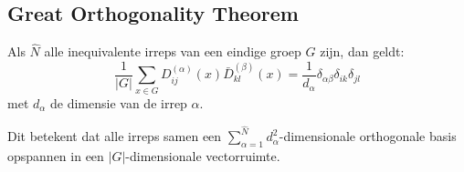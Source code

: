 \subsection{Great Orthogonality Theorem}

\begin{theorem}
    Als \(\hat{N}\) alle inequivalente irreps van een eindige groep \(G\) zijn, dan geldt:
    \[
    \frac{1}{|G|}\sum_{x \in G} D^{(\alpha)}_{ij}(x) \bar{D}^{(\beta)}_{kl}(x) = \frac{1}{d_\alpha} \delta_{\alpha\beta} \delta_{ik} \delta_{jl}
    \]
    met \(d_\alpha\) de dimensie van de irrep \(\alpha\).

    Dit betekent dat alle irreps samen een \(\sum_{\alpha=1}^{\hat{N}} d_\alpha^2\)-dimensionale orthogonale basis opspannen in een \(|G|\)-dimensionale vectorruimte.
\end{theorem}

